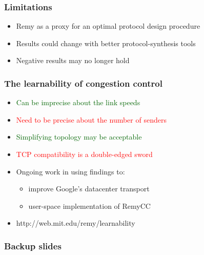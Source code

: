 \documentclass[svgnames]{beamer}
\begin{document}
\begin{Large}






 



\begin{frame}
\frametitle{Limitations}
\begin{itemize}
\item<2-> Remy as a proxy for an optimal protocol design procedure
\item<3-> Results could change with better protocol-synthesis tools
\item<4-> Negative results may no longer hold
\end{itemize}
\end{frame}

\begin{frame}
\frametitle{The learnability of congestion control}
\noindent
\begin{itemize}
\item<2-> \textcolor{darkgreen}{Can be imprecise about the link speeds}
\item<3-> \textcolor{red}{Need to be precise about the number of senders}
\item<4-> \textcolor{darkgreen}{Simplifying topology may be acceptable}
\item<5-> \textcolor{red}{TCP compatibility is a double-edged sword}
\item<6-> Ongoing work in using findings to:
\begin{itemize}
\item<2-> improve Google's datacenter transport
\item<3-> user-space implementation of RemyCC
\end{itemize}
\item<7-> http://web.mit.edu/remy/learnability
\end{itemize}
\end{frame}

\end{Large}

\begin{frame}
\frametitle{Backup slides}
\end{frame}







\end{document}
